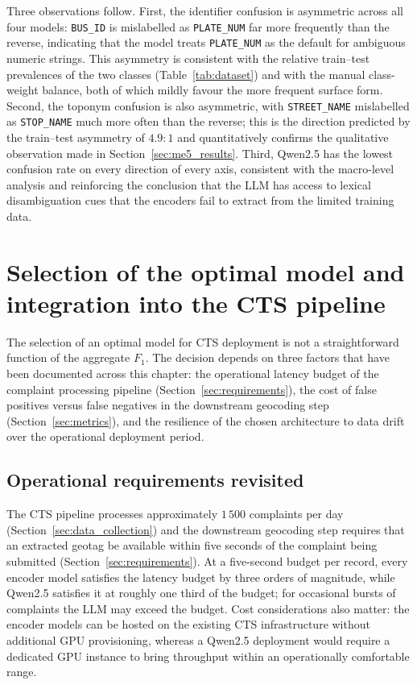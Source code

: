 Three observations follow. First, the identifier confusion is asymmetric across all four models: \texttt{BUS\_ID} is mislabelled as \texttt{PLATE\_NUM} far more frequently than the reverse, indicating that the model treats \texttt{PLATE\_NUM} as the default for ambiguous numeric strings. This asymmetry is consistent with the relative train--test prevalences of the two classes (Table~\ref{tab:dataset}) and with the manual class-weight balance, both of which mildly favour the more frequent surface form. Second, the toponym confusion is also asymmetric, with \texttt{STREET\_NAME} mislabelled as \texttt{STOP\_NAME} much more often than the reverse; this is the direction predicted by the train--test asymmetry of $4.9{:}1$ and quantitatively confirms the qualitative observation made in Section~\ref{sec:me5_results}. Third, Qwen2.5 has the lowest confusion rate on every direction of every axis, consistent with the macro-level analysis and reinforcing the conclusion that the LLM has access to lexical disambiguation cues that the encoders fail to extract from the limited training data.


\section{Selection of the optimal model and integration into the CTS pipeline}
\label{sec:integration}

The selection of an optimal model for CTS deployment is not a straightforward function of the aggregate $F_1$. The decision depends on three factors that have been documented across this chapter: the operational latency budget of the complaint processing pipeline (Section~\ref{sec:requirements}), the cost of false positives versus false negatives in the downstream geocoding step (Section~\ref{sec:metrics}), and the resilience of the chosen architecture to data drift over the operational deployment period.

\subsection{Operational requirements revisited}
\label{sec:op_requirements_revisited}

The CTS pipeline processes approximately $1\,500$ complaints per day (Section~\ref{sec:data_collection}) and the downstream geocoding step requires that an extracted geotag be available within five seconds of the complaint being submitted (Section~\ref{sec:requirements}). At a five-second budget per record, every encoder model satisfies the latency budget by three orders of magnitude, while Qwen2.5 satisfies it at roughly one third of the budget; for occasional bursts of complaints the LLM may exceed the budget. Cost considerations also matter: the encoder models can be hosted on the existing CTS infrastructure without additional GPU provisioning, whereas a Qwen2.5 deployment would require a dedicated GPU instance to bring throughput within an operationally comfortable range.

